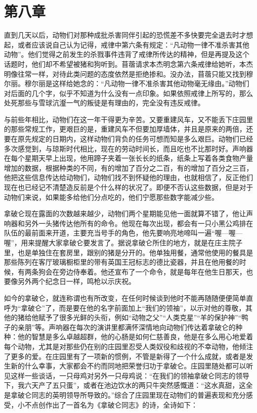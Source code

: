 \chapter{第八章}

直到几天以后，动物们对那种成批杀害同伴引起的恐慌差不多快要完全退去时才想起，或者应该说自己认为记得，戒律中第六条有规定：“凡动物一律不准杀害其他动物”。他们觉得之前发生的杀戮事件违背了戒律所传达的精神，但是再提及这个话题时，他们却不希望被猪和狗听到。苜蓿请求本杰明念第六条戒律给她听，本杰明像往常一样，对待此类问题的态度依然是拒绝掺和。没办法，苜蓿只能又找到穆尔丽。穆尔丽是这样给她念的：“凡动物一律不准杀害其他动物毫无缘由。”动物们对后面的几个字，似乎不知道为什么没有一点印象。如果依照戒律上所写的，那么处死那些与雪球沆瀣一气的叛徒是有理由的，完全没有违反戒律。

与前些年相比，动物们在这一年干得更为辛苦。又要重建风车，又不能丢下庄园里的那些常规工作，更艰巨的是，重建风车不但要加厚墙体，并且是原来的两倍，还要在原先规定的日期内，这样动物们背负的任务可想而知是多么艰巨。动物们已经多次感觉到，与琼斯时代相比，现在的劳动时间长，而且吃也不比那时好。声响器在每个星期天早上出现，他用蹄子夹着一张长长的纸条，纸条上写着各类食物产量增加的数据，根据种类的不同，有的增加了百分之二百，有的增加了百分之三百，他把这些信息传达给动物们，动物们找不到怀疑他的理由，也就相信了，反正他们现在也已经记不清楚造反前是个什么样的状况了。即便不否认这些数据，但是对于动物们来说，如果能多给他们分点吃的，他们宁愿那些数字能减少些。

拿破仑现在露面的次数越来越少，动物们两个星期能见他一面就算不错了，他让声响器和另外一头猪传达他所有的命令。他现在每次出现，都会有一只小黑公鸡排在队伍的最前面来开道，主要充当号手的角色，他先要响亮地啼叫一遍“喔—喔—喔”，用来提醒大家拿破仑要发言了。据说拿破仑所住的地方，就是在庄主院子里，也是单独住在套房里，跟别的猪是分开的。他单独用餐，通常他使用的餐具是那些陈列在客厅玻璃橱柜里的带有英国王冠标志的德比瓷器，并且在他用餐的时候，有两条狗会在旁边侍奉着。他还宣布了一个命令，就是每年在他生日那天，也要像另外两个纪念日一样，鸣枪以示庆祝。

如今的拿破仑，就连称谓也有所改变，在任何时候谈到他时不能再随随便便简单直呼为“拿破仑”了，而是要在他的名字前面加上“我们的领袖”，以示对他的尊敬，其他的猪给他赋予了很多光鲜的头衔，例如“动物之父”“人类克星”“羊的保护神”“鸭子的亲朋”等。声响器在每次的演讲里都满怀深情地向动物们传达着拿破仑的种种：他的智慧是多么卓越超群，他的心肠是如何仁慈善良，他是在多么用心地爱着每个动物，尤其是对那些仍在别的庄园里忍受人类奴役和歧视的不幸动物，他倾注了更多的爱。在庄园里有了一项新的惯例，不管是新得了一个什么成就，或者是发生新的什么幸事，大家都会不约而同地把荣誉归功于拿破仑。庄园里随处都可以听见这样一些谈话，一只母鸡对另外一只母鸡说：“在我们的领袖拿破仑同志的领导下，我六天产了五只蛋”，或者在池边饮水的两只牛突然感慨道：“这水真甜，这全是拿破仑同志的英明领导所导致的。”综合了庄园里现在动物们的普遍表现和充分感受，小不点创作出了一首名为《拿破仑同志》的诗，全诗如下：


